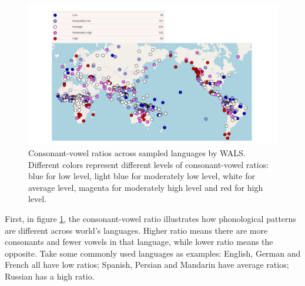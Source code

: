 \begin{figure}[h]
\centering
\captionsetup{justification=centering}
\includegraphics[width = 0.8\linewidth]{figures/WALS_example.pdf}
\caption{Consonant-vowel ratios across sampled languages by WALS. Different colors represent different levels of consonant-vowel ratios: blue for low level, light blue for moderately low level, white for average level, magenta for moderately high level and red for high level.}
\label{fig:wals_example}
\end{figure}

First, in figure \ref{fig:wals_example}, the consonant-vowel ratio illustrates how phonological patterns are different across world's languages. Higher ratio means there are more consonants and fewer vowels in that language, while lower ratio means the opposite. Take some commonly used languages as examples: English, German and French all have low ratios; Spanish, Persian and Mandarin have average ratios; Russian has a high ratio.

